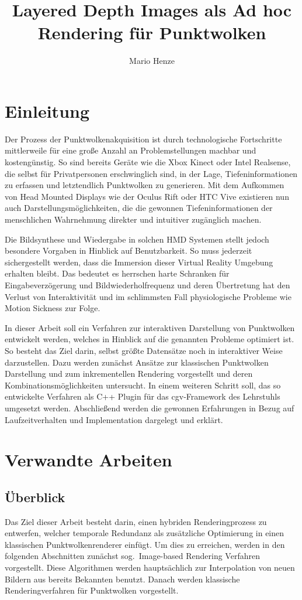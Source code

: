 \documentclass[hyperref, beleg, german, final, twoside]{cgvpub}
\author{Mario Henze}
\title{Layered Depth Images als Ad hoc Rendering für Punktwolken}
\begin{document}
\chapter{Einleitung}%
\label{sec:einleitung}

Der Prozess der Punktwolkenakquisition ist durch technologische Fortschritte
mittlerweile für eine große Anzahl an Problemstellungen machbar und
kostengünstig. So sind bereits Geräte wie die Xbox Kinect oder Intel
Realsense, die selbst für Privatpersonen erschwinglich sind, in der Lage,
Tiefeninformationen zu erfassen und letztendlich Punktwolken zu generieren. Mit
dem Aufkommen von Head Mounted Displays wie der Oculus Rift oder HTC Vive
existieren nun auch Darstellungsmöglichkeiten, die die gewonnen
Tiefeninformationen der menschlichen Wahrnehmung direkter und intuitiver
zugänglich machen.

Die Bildsynthese und Wiedergabe in solchen HMD Systemen stellt jedoch besondere
Vorgaben in Hinblick auf Benutzbarkeit. So muss jederzeit sichergestellt
werden, dass die Immersion dieser Virtual Reality Umgebung erhalten bleibt. Das
bedeutet es herrschen harte Schranken für Eingabeverzögerung und
Bildwiederholfrequenz und deren Übertretung hat den Verlust von Interaktivität
und im schlimmsten Fall physiologische Probleme wie Motion Sickness zur Folge.

In dieser Arbeit soll ein Verfahren zur interaktiven Darstellung von
Punktwolken entwickelt werden, welches in Hinblick auf die genannten Probleme
optimiert ist. So besteht das Ziel darin, selbst größte Datensätze noch in
interaktiver Weise darzustellen. Dazu werden zunächst Ansätze zur klassischen
Punktwolken Darstellung und zum inkrementellen Rendering vorgestellt und deren
Kombinationsmöglichkeiten untersucht. In einem weiteren Schritt soll, das so
entwickelte Verfahren als C++ Plugin für das cgv-Framework des Lehrstuhls
umgesetzt werden. Abschließend werden die gewonnen Erfahrungen in Bezug auf
Laufzeitverhalten und Implementation dargelegt und erklärt.

\chapter{Verwandte Arbeiten}%
\label{sec:verwandte_arbeiten}

\section{Überblick}

Das Ziel dieser Arbeit besteht darin, einen hybriden Renderingprozess zu
entwerfen, welcher temporale Redundanz als zusätzliche Optimierung in einen
klassischen Punktwolkenrenderer einfügt. Um dies zu erreichen, werden in den
folgenden Abschnitten zunächst sog.\ Image-based Rendering Verfahren
vorgestellt. Diese Algorithmen werden hauptsächlich zur Interpolation von neuen
Bildern aus bereits Bekannten benutzt. Danach werden klassische
Renderingverfahren für Punktwolken vorgestellt.
\end{document}
